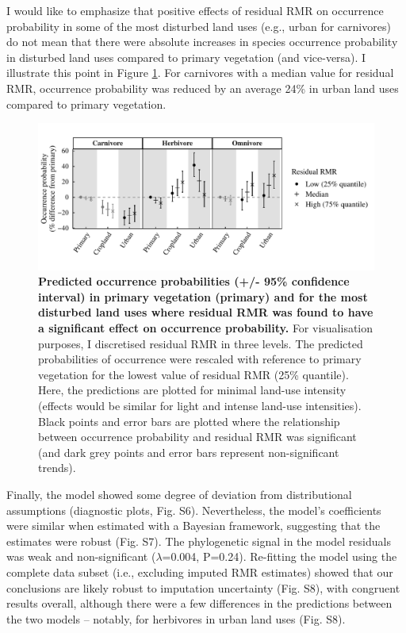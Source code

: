 \clearpage 
I would like to emphasize that positive effects of residual RMR on occurrence probability in some of the most disturbed land uses (e.g., urban for carnivores) do not mean that there were absolute increases in species occurrence probability in disturbed land uses compared to primary vegetation (and vice-versa). I illustrate this point in Figure \ref{chap5_fig5}. For carnivores with a median value for residual RMR, occurrence probability was reduced by an average 24\% in urban land uses compared to primary vegetation. 

\begin{figure}[h!]
\centering
\includegraphics[scale=0.65]{figures/Chapter5/Figure5}
\caption[Predicted occurrence probabilities in primary vegetation and for the most disturbed land uses where residual RMR was found to have a significant effect on occurrence probability]{\textbf{Predicted occurrence probabilities (+/- 95\% confidence interval) in primary vegetation (primary) and for the most disturbed land uses where residual RMR was found to have a significant effect on occurrence probability.} For visualisation purposes, I discretised residual RMR in three levels. The predicted probabilities of occurrence were rescaled with reference to primary vegetation for the lowest value of residual RMR (25\% quantile). Here, the predictions are plotted for minimal land-use intensity (effects would be similar for light and intense land-use intensities). Black points and error bars are plotted where the relationship between occurrence probability and residual RMR was significant (and dark grey points and error bars represent non-significant trends).}
\label{chap5_fig5}
\end{figure}

Finally, the model showed some degree of deviation from distributional assumptions (diagnostic plots, Fig. S6). Nevertheless, the model's coefficients were similar when estimated with a Bayesian framework, suggesting that the estimates were robust (Fig. S7). The phylogenetic signal in the model residuals was weak and non-significant ($\lambda$=0.004, P=0.24). Re-fitting the model using the complete data subset (i.e., excluding imputed RMR estimates) showed that our conclusions are likely robust to imputation uncertainty (Fig. S8), with congruent results overall, although there were a few differences in the predictions between the two models – notably, for herbivores in urban land uses (Fig. S8).  



